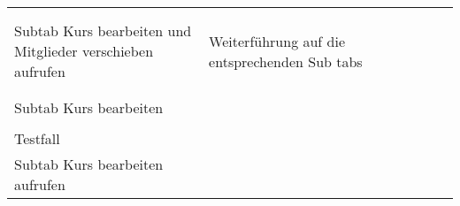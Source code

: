 \begin{table}[]
\begin{tabular}{p{6cm}p{7cm}p{3cm}llll}
&                                                                                                                                                                  &             &  &  &  \\
&                                                                                                                                                                  &             &  &  &  \\
		Subtab Kurs bearbeiten und Mitglieder verschieben aufrufen                                                                           & Weiterführung auf die entsprechenden Sub tabs                                                                                                                    & \checkmark           &  &  &  \\
		&                                                                                                                                                                  &             &  &  &  \\
		&                                                                                                                                                                  &             &  &  &  \\
		Subtab Kurs bearbeiten                                                                                                               &                                                                                                                                                                  &             &  &  &  \\
		&                                                                                                                                                                  &             &  &  &  \\
		Testfall                                                                                                                             &                                                                                                                                                                  &             &  &  &  \\
		Subtab Kurs bearbeiten aufrufen                                                                                                      &                                                                                                                                                                  &             &  &  &  \\

\end{tabular}
\end{table}
